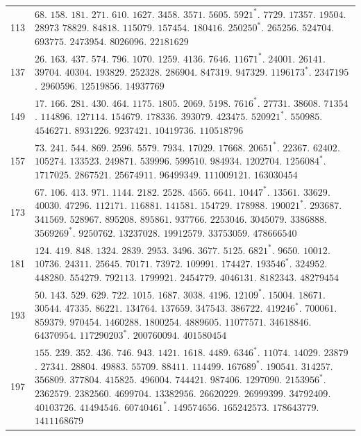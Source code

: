 %
\begingroup\small\setlength{\tabcolsep}{5pt}
\begin{longtable}{@{}r|p{\dimexpr\linewidth-38pt\relax}@{}}
113 & $68$. $158$. $181$. $271$. $610$. $1627$. $3458$. $3571$. $5605$. $5921^{*}$. $7729$. $17357$. $19504$. $28973$ $78829$. $84818$. $115079$. $157454$. $180416$. $250250^{*}$. $265256$. $524704$. $693775$. $2473954$. $8026096$. $22181629$\\
137 & $26$. $163$. $437$. $574$. $796$. $1070$. $1259$. $4136$. $7646$. $11671^{*}$. $24001$. $26141$. $39704$. $40304$. $193829$. $252328$. $286904$. $847319$. $947329$. $1196173^{*}$. $2347195$. $2960596$. $12519856$. $14937769$\\
149 & $17$. $166$. $281$. $430$. $464$. $1175$. $1805$. $2069$. $5198$. $7616^{*}$. $27731$. $38608$. $71354$. $114896$. $127114$. $154679$. $178336$. $393079$. $423475$. $520921^{*}$. $550985$. $4546271$. $8931226$. $9237421$. $10419736$. $110518796$\\
157 & $73$. $241$. $544$. $869$. $2596$. $5579$. $7934$. $17029$. $17668$. $20651^{*}$. $22367$. $62402$. $105274$. $133523$. $249871$. $539996$. $599510$. $984934$. $1202704$. $1256084^{*}$. $1717025$. $2867521$. $25674911$. $96499349$. $111009121$. $163030454$\\
173 & $67$. $106$. $413$. $971$. $1144$. $2182$. $2528$. $4565$. $6641$. $10447^{*}$. $13561$. $33629$. $40030$. $47296$. $112171$. $116881$. $141581$. $154729$. $178988$. $190021^{*}$. $293687$. $341569$. $528967$. $895208$. $895861$. $937766$. $2253046$. $3045079$. $3386888$. $3569269^{*}$. $9250762$. $13237028$. $19912579$. $33753059$. $478666540$\\
181 & $124$. $419$. $848$. $1324$. $2839$. $2953$. $3496$. $3677$. $5125$. $6821^{*}$. $9650$. $10012$. $10736$. $24311$. $25645$. $70171$. $73972$. $109991$. $174427$. $193546^{*}$. $324952$. $448280$. $554279$. $792113$. $1799921$. $2454779$. $4046131$. $8182343$. $48279454$\\
193 & $50$. $143$. $529$. $629$. $722$. $1015$. $1687$. $3038$. $4196$. $12109^{*}$. $15004$. $18671$. $30544$. $47335$. $86221$. $134764$. $137659$. $347543$. $386722$. $419246^{*}$. $700061$. $859379$. $970454$. $1460288$. $1800254$. $4889605$. $11077571$. $34618846$. $64370954$. $117290203^{*}$. $200760094$. $401580454$\\
197 & $155$. $239$. $352$. $436$. $746$. $943$. $1421$. $1618$. $4489$. $6346^{*}$. $11074$. $14029$. $23879$. $27341$. $28804$. $49883$. $55709$. $88411$. $114499$. $167689^{*}$. $190541$. $314257$. $356809$. $377804$. $415825$. $496004$. $744421$. $987406$. $1297090$. $2153956^{*}$. $2362579$. $2382560$. $4699704$. $13382956$. $26620229$. $26999399$. $34792409$. $40103726$. $41494546$. $60740461^{*}$. $149574656$. $165242573$. $178643779$. $1411168679$\\
\end{longtable}\endgroup
